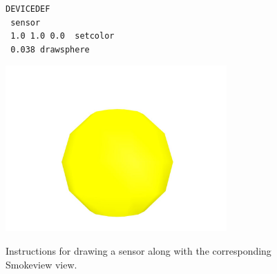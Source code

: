 \documentclass[11pt,twoside]{book}
\newcommand{\figoptions}{hbp}
\newcommand{\figheightA}{2.5in}
\begin{document}
\begin{figure}[\figoptions]
\begin{Verbatim}[frame=single,rulecolor=\color{blue},
framerule=3pt,framesep=1pc,fillcolor=\color{yellow}]
DEVICEDEF
 sensor
 1.0 1.0 0.0  setcolor
 0.038 drawsphere
\end{Verbatim}
\begin{center}
\includegraphics[height=\figheightA]{figures/sensorplain}\\
\end{center}
\caption{Instructions for drawing a sensor along with the corresponding Smokeview view.}
\label{figsensor}%
\end{figure}
\end{document}
